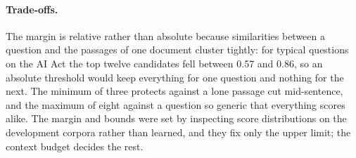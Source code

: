 \paragraph{Trade-offs.} The margin is relative rather than absolute because
similarities between a question and the passages of one document cluster
tightly: for typical questions on the AI Act the top twelve candidates fell
between 0.57 and 0.86, so an absolute threshold would keep everything for one
question and nothing for the next. The minimum of three protects against a
lone passage cut mid-sentence, and the maximum of eight against a question so
generic that everything scores alike. The margin and bounds were set by
inspecting score distributions on the development corpora rather than learned,
and they fix only the upper limit; the context budget decides the rest.
